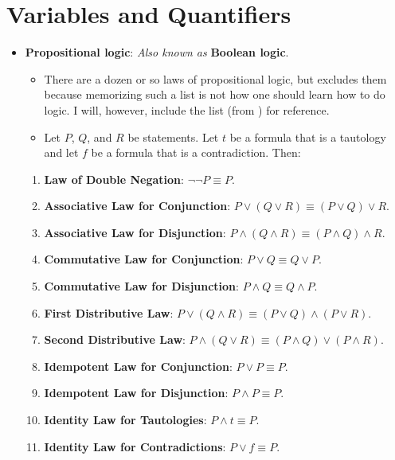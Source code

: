 \documentclass[../main.tex]{subfiles}
\begin{document}
\section{Variables and Quantifiers}
\begin{itemize}
    \item \textbf{Propositional logic}:  \emph{Also known as} \textbf{Boolean logic}.
    \begin{itemize}
        \item There are a dozen or so laws of propositional logic, but \cite{bib:AnalysisI} excludes them because memorizing such a list is not how one should learn how to do logic. I will, however, include the list (from \cite{bib:PropositionalLogicLaws}) for reference.
        \item Let $P$, $Q$, and $R$ be statements. Let $t$ be a formula that is a tautology and let $f$ be a formula that is a contradiction. Then:
    \end{itemize}
    \begin{enumerate}
        \item \textbf{Law of Double Negation}: $\neg\neg P\equiv P$.
        \item \textbf{Associative Law for Conjunction}: $P\vee(Q\vee R)\equiv (P\vee Q)\vee R$.
        \item \textbf{Associative Law for Disjunction}: $P\wedge(Q\wedge R)\equiv(P\wedge Q)\wedge R$.
        \item \textbf{Commutative Law for Conjunction}: $P\vee Q\equiv Q\vee P$.
        \item \textbf{Commutative Law for Disjunction}: $P\wedge Q\equiv Q\wedge P$.
        \item \textbf{First Distributive Law}: $P\vee(Q\wedge R)\equiv(P\vee Q)\wedge(P\vee R)$.
        \item \textbf{Second Distributive Law}: $P\wedge(Q\vee R)\equiv(P\wedge Q)\vee(P\wedge R)$.
        \item \textbf{Idempotent Law for Conjunction}: $P\vee P\equiv P$.
        \item \textbf{Idempotent Law for Disjunction}: $P\wedge P\equiv P$.
        \item \textbf{Identity Law for Tautologies}: $P\wedge t\equiv P$.
        \item \textbf{Identity Law for Contradictions}: $P\vee f\equiv P$.

\end{enumerate}
\end{itemize}
\end{document}
